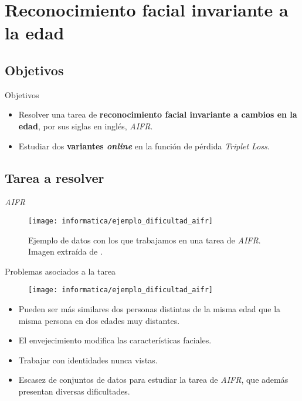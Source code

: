 \section{Reconocimiento facial invariante a la edad}

\subsection{Objetivos}
\begin{frame}{Objetivos}

	\begin{itemize}
		\item Resolver una tarea de \textbf{reconocimiento facial invariante a cambios en la edad}, por sus siglas en inglés, \textit{AIFR}.
	\end{itemize}

	\begin{itemize}
		\item Estudiar dos \textbf{variantes \textit{online}} en la función de pérdida \textit{Triplet Loss}.
	\end{itemize}

\end{frame}

\subsection{Tarea a resolver}

\begin{frame}{\textit{AIFR}}

	\begin{figure}
		\texttt{[image: informatica/ejemplo\_dificultad\_aifr]}
		\caption{Ejemplo de datos con los que trabajamos en una tarea de \textit{AIFR}. Imagen extraída de \cite{informatica:aifr_survey}.}
		\label{img:ejemplo_dificultad_aifr}
	\end{figure}

\end{frame}

\begin{frame}{Problemas asociados a la tarea}

	\begin{figure}
		\texttt{[image: informatica/ejemplo\_dificultad\_aifr]}
	\end{figure}

	\begin{itemize}
		\item Pueden ser más similares dos personas distintas de la misma edad que la misma persona en dos edades muy distantes.
		\item El envejecimiento modifica las características faciales.
		\item Trabajar con identidades nunca vistas.
		\item Escasez de conjuntos de datos para estudiar la tarea de \textit{AIFR}, que además presentan diversas dificultades.
	\end{itemize}

\end{frame}

